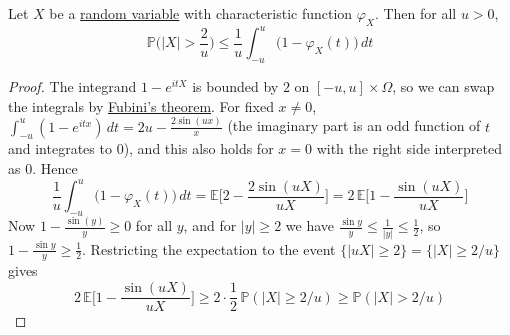 	\begin{lemma}
	  \label{thm:tail-bound-via-cf}
		Let $X$ be a \hyperref[def:random-variable]{random variable} with characteristic function $\varphi_X$. Then for all $u > 0$, 
		\begin{equation}
			\mathbb{P}\bigg( |X| > \frac{2}{u} \bigg) \leq \frac{1}{u} \int_{-u}^{u} \big( 1 - \varphi_X (t) \big) \,dt
		\end{equation}
	\end{lemma}
	\begin{proof}
		The integrand $1 - e^{i t X}$ is bounded by $2$ on $[-u, u] \times \Omega$, so we can swap the integrals by \hyperref[mt-thm:fubinis-theorem]{Fubini's theorem}. For fixed $x \neq 0$, $\int_{-u}^u (1 - e^{i t x}) \,dt = 2u - \frac{2 \sin(u x)}{x}$ (the imaginary part is an odd function of $t$ and integrates to $0$), and this also holds for $x = 0$ with the right side interpreted as $0$. Hence 
		\begin{equation}
			\frac{1}{u} \int_{-u}^{u} \big( 1 - \varphi_X (t) \big) \,dt = \mathbb{E}\bigg[ 2 - \frac{2 \sin(u X)}{u X} \bigg] = 2 \, \mathbb{E}\bigg[ 1 - \frac{\sin(u X)}{u X} \bigg]
		\end{equation}
		Now $1 - \frac{\sin(y)}{y} \geq 0$ for all $y$, and for $|y| \geq 2$ we have $\frac{\sin y}{y} \leq \frac{1}{|y|} \leq \frac{1}{2}$, so $1 - \frac{\sin y}{y} \geq \frac{1}{2}$. Restricting the expectation to the event $\{|u X| \geq 2\} = \{|X| \geq 2/u\}$ gives 
		\begin{equation}
			2 \, \mathbb{E}\bigg[ 1 - \frac{\sin(u X)}{u X} \bigg] \geq 2 \cdot \frac{1}{2} \, \mathbb{P}(|X| \geq 2/u) \geq \mathbb{P}(|X| > 2/u)
		\end{equation}
	\end{proof}


